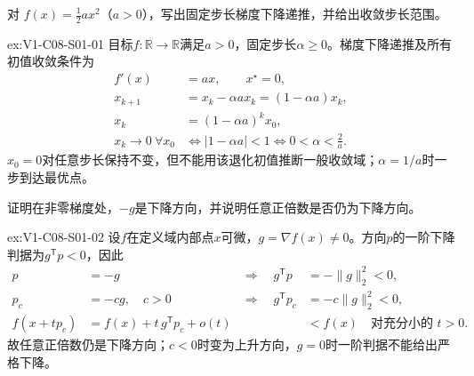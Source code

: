 \begin{SLChapterExercisePairSection}

\begin{exercise}\label{ex:V1-C08-S01-01}
对 $f(x)=\tfrac12ax^2$（$a>0$），写出固定步长梯度下降递推，并给出收敛步长范围。
\end{exercise}
\label{sol:V1-C08-S01-01}
\begin{chapterexercisesolution}{ex:V1-C08-S01-01}
目标$f:\mathbb R\to\mathbb R$满足$a>0$，固定步长$\alpha\ge0$。梯度下降递推及所有初值收敛条件为
\[
\begin{aligned}
f'(x)&=ax,\qquad x^\star=0,\\
x_{k+1}&=x_k-\alpha ax_k=(1-\alpha a)x_k,\\
x_k&=(1-\alpha a)^kx_0,\\
x_k\to0\ \forall x_0
&\Longleftrightarrow |1-\alpha a|<1
\Longleftrightarrow 0<\alpha<\frac2a.
\end{aligned}
\]
$x_0=0$对任意步长保持不变，但不能用该退化初值推断一般收敛域；$\alpha=1/a$时一步到达最优点。
\end{chapterexercisesolution}

\begin{exercise}\label{ex:V1-C08-S01-02}
证明在非零梯度处，$-g$是下降方向，并说明任意正倍数是否仍为下降方向。
\end{exercise}
\label{sol:V1-C08-S01-02}
\begin{chapterexercisesolution}{ex:V1-C08-S01-02}
设$f$在定义域内部点$x$可微，$g=\nabla f(x)\ne0$。方向$p$的一阶下降判据为$g^{\mathsf T}p<0$，因此
\[
\begin{aligned}
p&=-g
&\Longrightarrow\quad g^{\mathsf T}p&=-\|g\|_2^2<0,\\
p_c&=-c g,\quad c>0
&\Longrightarrow\quad g^{\mathsf T}p_c&=-c\|g\|_2^2<0,\\
f(x+t p_c)&=f(x)+t\,g^{\mathsf T}p_c+o(t)
& &<f(x)\quad\text{对充分小的 }t>0.
\end{aligned}
\]
故任意正倍数仍是下降方向；$c<0$时变为上升方向，$g=0$时一阶判据不能给出严格下降。
\end{chapterexercisesolution}


\end{SLChapterExercisePairSection}
